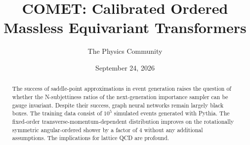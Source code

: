 \documentclass[11pt]{article}
\title{COMET: Calibrated Ordered Massless Equivariant Transformers}
\author{The Physics Community}
\date{September 24, 2026}
\numberwithin{equation}{section}
\theoremstyle{definition}
\theoremstyle{remark}
\begin{document}
\maketitle
\begin{abstract}
The success of saddle-point approximations in event generation raises
the question of whether the N-subjettiness ratios of the next-generation
importance sampler can be gauge invariant. Despite their success, graph
neural networks remain largely black boxes. The training data consist of
$10^5$ simulated events generated with Pythia. The fixed-order
transverse-momentum-dependent distribution improves on the rotationally
symmetric angular-ordered shower by a factor of 4 without any additional
assumptions. The implications for lattice QCD are profound.
\end{abstract}
\tableofcontents





\nocite{*}


\end{document}
